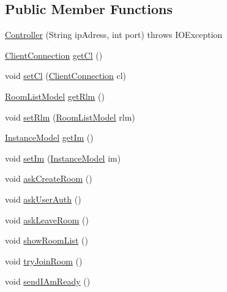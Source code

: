 \subsection*{Public Member Functions}
\begin{DoxyCompactItemize}
\item 
\mbox{\hyperlink{classClient_1_1Controller_a65c1ddbad549d42f6ba2f6b3399298f3}{Controller}} (String ip\+Adress, int port)  throws I\+O\+Exception 
\item 
\mbox{\hyperlink{classClient_1_1NetWork_1_1ClientConnection}{Client\+Connection}} \mbox{\hyperlink{classClient_1_1Controller_a4fa5b128b0e5bc44b3d43d43a0138947}{get\+Cl}} ()
\item 
void \mbox{\hyperlink{classClient_1_1Controller_a8ceabaf6a812062b80ac436051788c80}{set\+Cl}} (\mbox{\hyperlink{classClient_1_1NetWork_1_1ClientConnection}{Client\+Connection}} cl)
\item 
\mbox{\hyperlink{classClient_1_1Model_1_1RoomListModel}{Room\+List\+Model}} \mbox{\hyperlink{classClient_1_1Controller_ab33c8837d38c317e03eb6e85e004b586}{get\+Rlm}} ()
\item 
void \mbox{\hyperlink{classClient_1_1Controller_a5d1f7a0a03cf8c3fc186e146ee120ba4}{set\+Rlm}} (\mbox{\hyperlink{classClient_1_1Model_1_1RoomListModel}{Room\+List\+Model}} rlm)
\item 
\mbox{\hyperlink{classClient_1_1Model_1_1InstanceModel}{Instance\+Model}} \mbox{\hyperlink{classClient_1_1Controller_a5cf5f6cb57dab7e260afbf74d6fb4172}{get\+Im}} ()
\item 
void \mbox{\hyperlink{classClient_1_1Controller_a1fc8a5aa222b67716c38d619859f705f}{set\+Im}} (\mbox{\hyperlink{classClient_1_1Model_1_1InstanceModel}{Instance\+Model}} im)
\item 
void \mbox{\hyperlink{classClient_1_1Controller_af3340930e5e87ff85c999d1ace5599e5}{ask\+Create\+Room}} ()
\item 
void \mbox{\hyperlink{classClient_1_1Controller_a4fc90c7e8e74086df88c51eed886c3b8}{ask\+User\+Auth}} ()
\item 
void \mbox{\hyperlink{classClient_1_1Controller_af426bc10eea7f6e7655ff2236b8c160f}{ask\+Leave\+Room}} ()
\item 
void \mbox{\hyperlink{classClient_1_1Controller_a934e1454a2178677cfb7df0d6a6ae54e}{show\+Room\+List}} ()
\item 
void \mbox{\hyperlink{classClient_1_1Controller_af60204a5c842fb77982ae3e8e6635f62}{try\+Join\+Room}} ()
\item 
void \mbox{\hyperlink{classClient_1_1Controller_a7c0ed9c77e04d29b17c75f1141c2bb48}{send\+I\+Am\+Ready}} ()

\end{DoxyCompactItemize}
